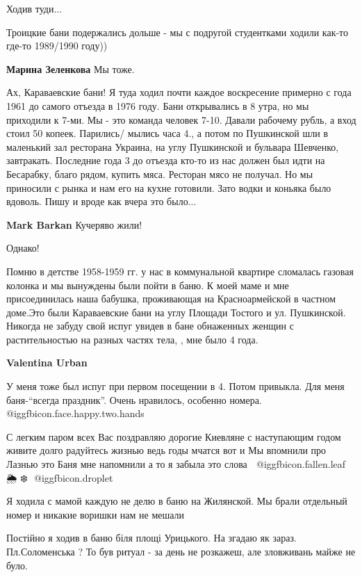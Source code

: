 \begin{itemize}
Ходив туди...

Троицкие бани подержались дольше - мы с подругой студентками ходили как-то где-то 1989/1990 году))

\textbf{Марина Зеленкова} Мы тоже.


Ах, Караваевские бани! Я туда ходил почти каждое воскресение примерно с года
1961 до самого отъезда в 1976 году. Бани открывались в 8 утра, но мы приходили
к 7-ми. Мы - это команда человек 7-10. Давали рабочему рубль, а вход стоил 50
копеек. Парились/ мылись часа 4., а потом по Пушкинской шли в маленький зал
ресторана Украина, на углу Пушкинской и бульвара Шевченко, завтракать.
Последние года 3 до отъезда кто-то из нас должен был идти на Бесарабку, благо
рядом, купить мяса. Ресторан мясо не получал. Но мы приносили с рынка и нам его
на кухне готовили. Зато водки и коньяка было вдоволь. Пишу и вроде как вчера
это было...

\begin{itemize} %
\textbf{Mark Barkan} Кучеряво жили!

Однако!
\end{itemize} %


Помню в детстве 1958-1959 гг. у нас в коммунальной квартире сломалась газовая
колонка и мы вынуждены были пойти в баню. К моей маме и мне присоединилась наша
бабушка, проживающая на Красноармейской в частном доме.Это были Караваевские
бани на углу Площади Тостого и ул. Пушкинской. Никогда не забуду свой испуг
увидев в бане обнаженных женщин с растительностью на разных частях тела, , мне
было 4 года.

\begin{itemize} %
\textbf{Valentina Urban}

У меня тоже был испуг при первом посещении в 4. Потом привыкла. Для меня
баня-\enquote{всегда праздник}. Очень нравилось, особенно номера. @igg{fbicon.face.happy.two.hands} 

\end{itemize} %


С легким паром всех Вас поздравляю дорогие Киевляне с наступающим годом живите
долго радуйтесь жизнью ведь годы мчатся вот и Мы впомнили про Лазнью это Баня
мне напомнили а то я забыла это слова 🍄 @igg{fbicon.fallen.leaf} 🌦 ❄ ️
@igg{fbicon.droplet} 



Я ходила с мамой каждую не делю в баню на Жилянской. Мы брали отдельный номер и
никакие воришки нам не мешали


Постійно я ходив в баню біля площі Урицького. На згадаю як зараз.
Пл.Соломенська ?  То був ритуал - за день не розкажеш, але зловживань майже не
було.


\end{itemize} %
